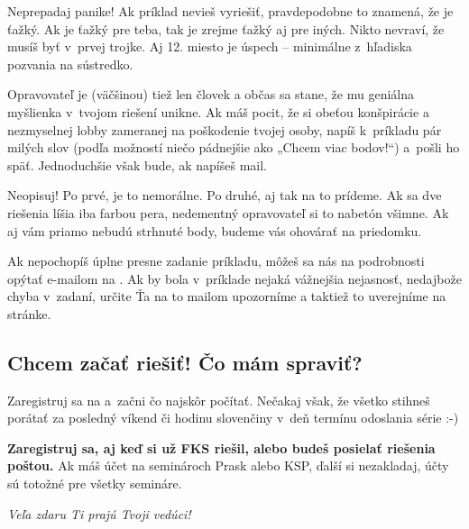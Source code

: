     Neprepadaj panike! Ak príklad nevieš vyriešiť, pravdepodobne to znamená, že je
    ťažký. Ak je ťažký pre teba, tak je zrejme ťažký aj pre iných. Nikto nevraví,
    že musíš byť v~prvej trojke. Aj 12. miesto je úspech -- minimálne z~hľadiska
    pozvania na sústredko.

    Opravovateľ je (väčšinou) tiež len človek a občas sa stane, že mu geniálna
    myšlienka v~tvojom riešení unikne. Ak máš pocit, že si obeťou konšpirácie a
    nezmyselnej lobby zameranej na poškodenie tvojej osoby, napíš k~príkladu pár
    milých slov (podľa možností niečo pádnejšie ako „Chcem viac bodov!“) a~pošli
    ho späť. Jednoduchšie však bude, ak napíšeš mail.

    Neopisuj! Po prvé, je to nemorálne. Po druhé, aj tak na to prídeme. Ak sa dve riešenia
    líšia iba farbou pera, nedementný opravovateľ si to nabetón všimne. Ak aj vám
    priamo nebudú strhnuté body, budeme vás ohovárať na priedomku.

    Ak nepochopíš úplne presne zadanie príkladu, môžeš sa nás na podrobnosti opýtať
    e-mailom na {\URL{\seminarEmail}}. Ak by bola v~príklade nejaká vážnejšia
    nejasnosť, nedajbože chyba v~zadaní, určite Ťa na to mailom upozorníme a taktiež to uverejníme na stránke.

\subsection{Chcem začať riešiť! Čo mám spraviť?}
    Zaregistruj sa na \URL{\seminarURL} a~začni čo najskôr počítať. Nečakaj však, že všetko stihneš porátať
    za posledný víkend či hodinu slovenčiny v~deň termínu odoslania série :-)

    \textbf{Zaregistruj sa, aj keď si už FKS riešil, alebo budeš posielať riešenia poštou.}
    Ak máš účet na seminároch Prask alebo KSP, ďalší si nezakladaj, účty sú totožné pre všetky semináre.

\hfill \emph{Veľa zdaru Ti prajú Tvoji vedúci!}%
